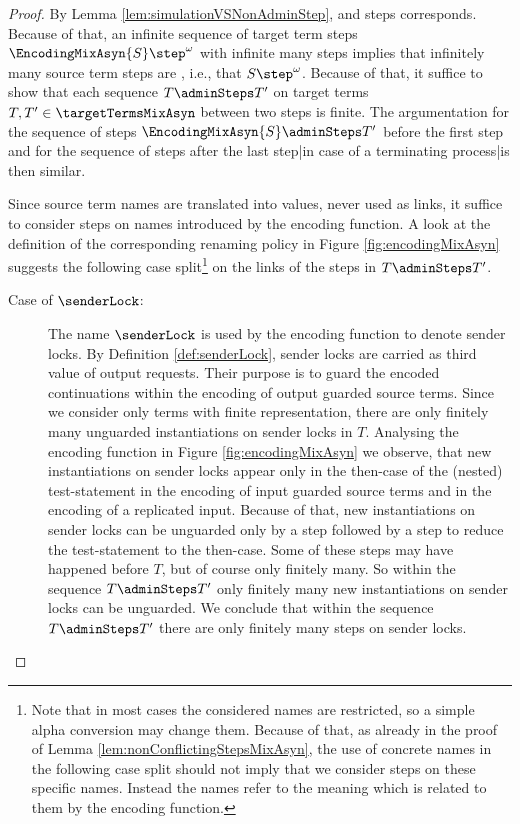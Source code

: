 \documentclass[]{llncs}
\begin{document}
\begin{proof}
	By Lemma \ref{lem:simulationVSNonAdminStep}, \simulations and \nonAdmin steps corresponds. Because of that, an infinite sequence of target term steps $ \EncodingMixAsyn{S} \step^{\omega} $ with infinite many \nonAdmin steps implies that infinitely many source term steps are \simulated, i.e., that $ S \step^{\omega} $. Because of that, it suffice to show that each sequence $ T \adminSteps T' $ on target terms $ T, T' \in \targetTermsMixAsyn $ between two \nonAdmin steps is finite. The argumentation for the sequence of \admin steps $ \EncodingMixAsyn{S} \adminSteps T' $ before the first \nonAdmin step and for the sequence of \admin steps after the last \nonAdmin step|in case of a terminating process|is then similar.
	
	Since source term names are translated into values, never used as links, it suffice to consider steps on names introduced by the encoding function. A look at the definition of the corresponding renaming policy in Figure \ref{fig:encodingMixAsyn} suggests the following case split\footnote{Note that in most cases the considered names are restricted, so a simple alpha conversion may change them. Because of that, as already in the proof of Lemma \ref{lem:nonConflictingStepsMixAsyn}, the use of concrete names in the following case split should not imply that we consider steps on these specific names. Instead the names refer to the meaning which is related to them by the encoding function.} on the links of the steps in $ T \adminSteps T' $.
	\begin{description}
		\item[Case of $ \senderLock $:] The name $ \senderLock $ is used by the encoding function to denote sender locks. By Definition \ref{def:senderLock}, sender locks are carried as third value of output requests. Their purpose is to guard the encoded continuations within the encoding of output guarded source terms. Since we consider only terms with finite representation, there are only finitely many unguarded instantiations on sender locks in $ T $. Analysing the encoding function in Figure \ref{fig:encodingMixAsyn} we observe, that new instantiations on sender locks appear only in the then-case of the (nested) test-statement in the encoding of input guarded source terms and in the encoding of a replicated input. Because of that, new instantiations on sender locks can be unguarded only by a \nonAdmin step followed by a \pure \admin step to reduce the test-statement to the then-case. Some of these \nonAdmin steps may have happened before $ T $, but of course only finitely many. So within the sequence $ T \adminSteps T' $ only finitely many new instantiations on sender locks can be unguarded. We conclude that within the sequence $ T \adminSteps T' $ there are only finitely many steps on sender locks.
			

\end{description}
\end{proof}
\end{document}
